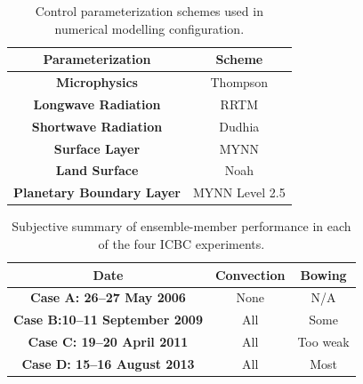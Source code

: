 \documentclass{ametsoc}
\begin{document}
%
\begin{table}[tb]
\caption{Control parameterization schemes used in numerical modelling configuration.}
\label{tab:WRFconfig}
\begin{center}
\begin{tabular}{cc}
\hline \hline
{\textbf{Parameterization}} & {\textbf{Scheme}} \\ \hline
{\textbf{Microphysics}} & Thompson \\ 
{\textbf{Longwave Radiation}} & RRTM  \\ 
{\textbf{Shortwave Radiation}} & Dudhia \\ 
{\textbf{Surface Layer}} & MYNN \\ 
{\textbf{Land Surface}} & Noah \\ 
{\textbf{Planetary Boundary Layer}} & MYNN Level 2.5  \\ 
\end{tabular}
\end{center}
\end{table}

\begin{table}[tb]
\caption{Subjective summary of ensemble-member performance in each of the four ICBC experiments.}
\label{tab:summary}
\begin{center}
\begin{tabular}{c|cc}
\hline \hline
{\textbf{Date}} & {\textbf{Convection}} & {\textbf{Bowing}} \\ \hline
{\textbf{Case A: 26--27 May 2006}} & None & N/A \\
{\textbf{Case B:10--11 September 2009}} & All & Some  \\ 
{\textbf{Case C: 19--20 April 2011}} & All & Too weak \\ 
{\textbf{Case D: 15--16 August 2013}} & All & Most\\ 
\end{tabular}
\end{center}
\end{table}
\end{document}
